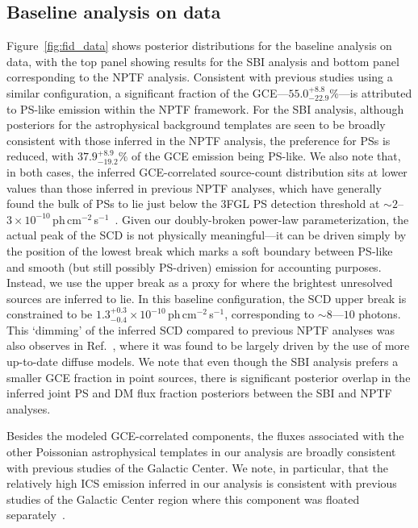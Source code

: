 \documentclass[prd,aps,10pt,nofootinbib,twocolumn,superscriptaddress,preprintnumbers,balancelastpage,longbibliography,floatfix]{revtex4-2}
\begin{document}
\subsection{Baseline analysis on \Fermi data}
\label{sec:baseline}

Figure~\ref{fig:fid_data} shows posterior distributions for the baseline analysis on \Fermi data, with the top panel showing results for the SBI analysis and bottom panel corresponding to the NPTF analysis. Consistent with previous studies using a similar configuration, a significant fraction of the GCE---$55.0^{+8.8}_{-22.9}\%$---is attributed to PS-like emission within the NPTF framework. For the SBI analysis, although posteriors for the astrophysical background templates are seen to be broadly consistent with those inferred in the NPTF analysis, the preference for PSs is reduced, with $37.9^{+8.9}_{-19.2}\%$ of the GCE emission being PS-like. We also note that, in both cases, the inferred GCE-correlated source-count distribution sits at lower values than those inferred in previous NPTF analyses, which have generally found the bulk of PSs to lie just below the 3FGL PS detection threshold at $\sim2$--$3\times 10^{-10}$\,ph\,cm$^{-2}$\,s$^{-1}$~\cite{Lee:2015fea}. Given our doubly-broken power-law parameterization, the actual peak of the SCD is not physically meaningful---it can be driven simply by the position of the lowest break which marks a soft boundary between PS-like and smooth (but still possibly PS-driven) emission for accounting purposes. Instead, we use the upper break as a proxy for where the brightest unresolved sources are inferred to lie. In this baseline configuration, the SCD upper break is constrained to be $1.3^{+0.3}_{-0.4}\times 10^{-10}$\,ph\,cm$^{-2}$\,s$^{-1}$, corresponding to $\sim8$---$10$ photons. This `dimming' of the inferred SCD compared to previous NPTF analyses was also observes in Ref.~\cite{List:2021aer}, where it was found to be largely driven by the use of more up-to-date diffuse models. We note that even though the SBI analysis prefers a smaller GCE fraction in point sources, there is significant posterior overlap in the inferred joint PS and DM flux fraction posteriors between the SBI and NPTF analyses.

Besides the modeled GCE-correlated components, the fluxes associated with the other Poissonian astrophysical templates in our analysis are broadly consistent with previous studies of the Galactic Center. We note, in particular, that the relatively high ICS emission inferred in our analysis is consistent with previous studies of the Galactic Center region where this component was floated separately~\cite{Fermi-LAT:2015sau,List:2021aer,Calore:2014xka,Calore:2014nla}.
\end{document}
